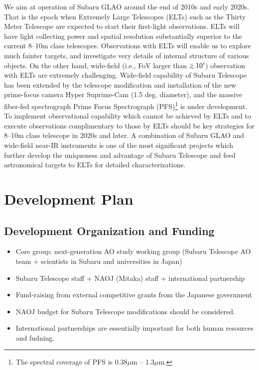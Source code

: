 We aim at operation of Subaru GLAO around the end of 2010s and early
2020s. That is the epoch when Extremely Large Telescopes (ELTs) such as
the Thirty Meter Telescope are expected to start their first-light
observations. ELTs will have light collecting power and spatial
resolution substantially superior to the current 8--10m class
telescopes. Observations with ELTs will enable us to explore much
fainter targets, and investigate very details of internal structure of
various objects. On the other hand, wide-field (i.e., FoV larger than
$\gsim10'$) observation with ELTs are extremely challenging. Wide-field
capability of Subaru Telescope has been extended by the telescope
modification and installation of the new prime-focus camera Hyper
Suprime-Cam (1.5 deg. diameter), and the massive fiber-fed spectrograph 
Prime Focus Spectrograph (PFS)\footnote{The spectral coverage of PFS is
0.38$\mu$m -- 1.3$\mu$m.} is under development.
To implement observational capability which cannot be achieved by ELTs
and to execute observations complimentary to those by ELTs should be key
strategies for 8--10m class telescope in 2020s and later. 
A combination of Subaru GLAO and wide-field near-IR instruments is one
of the most significant projects which further develop the uniqueness
and advantage of Subaru Telescope and feed astronomical targets to ELTs
for detailed characterizations.

\bigskip



\section{Development Plan}


\subsection{Development Organization and Funding}

\begin{itemize}
 \item Core group: next-generation AO study working group (Subaru
       Telescope AO team + scientists in Subaru and universities in
       Japan)
 \item Subaru Telescope staff + NAOJ (Mitaka) staff + international
       partnership
 \item Fund-raising from external competitive grants from the Japanese 
       government 
 \item NAOJ budget for Subaru Telescope modifications should be
       considered. 
 \item International partnerships are essentially important for both
       human resources and fudning.
\end{itemize}

